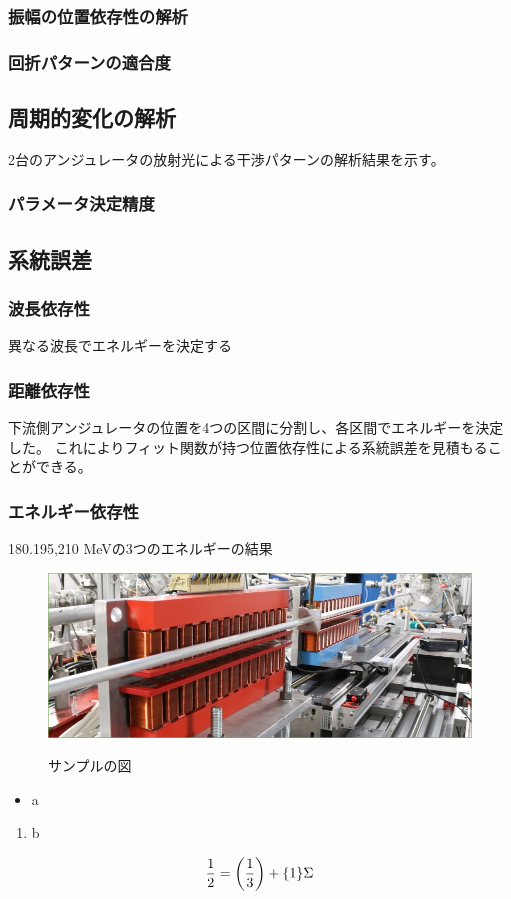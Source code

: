 \documentclass[a4paper,11pt,uplatex]{jsbook}
\begin{document}
\subsubsection{振幅の位置依存性の解析}
\subsubsection{回折パターンの適合度}


\subsection{周期的変化の解析}
2台のアンジュレータの放射光による干渉パターンの解析結果を示す。
\subsubsection{パラメータ決定精度}

\subsection{系統誤差}
\subsubsection{波長依存性}
異なる波長でエネルギーを決定する

\subsubsection{距離依存性}
下流側アンジュレータの位置を4つの区間に分割し、各区間でエネルギーを決定した。
これによりフィット関数が持つ位置依存性による系統誤差を見積もることができる。

\subsubsection{エネルギー依存性}
180.195,210 MeVの3つのエネルギーの結果












\clearpage

\begin{figure}[tb]
  \centering
  \includegraphics[width=0.8\linewidth]{image/1-1.jpg}\\
  \caption{サンプルの図}
  \label{sample_image}
\end{figure}

\begin{itemize}
  \item a
\end{itemize}
\begin{enumerate}
  \item b
\end{enumerate}

\begin{align}
\frac{1}{2} = \qty(\frac{1}{3}) + \qty{1}\Sigma
\end{align}
\end{document}
